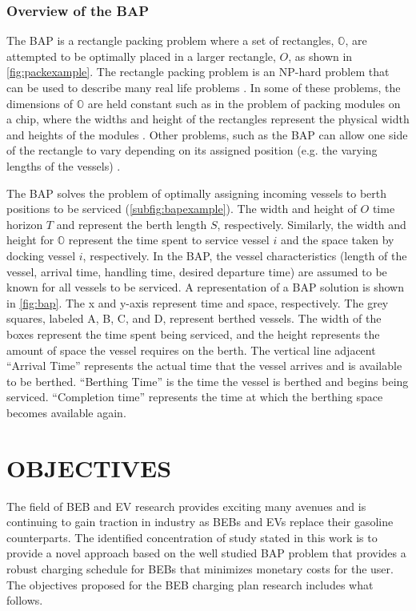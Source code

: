 \documentclass[ee,msthesis]{usuthesis}
\begin{document}
\subsection{Overview of the BAP}
\label{sec:overview-of-the-bap}
The BAP is a rectangle packing problem where a set of rectangles, \(\mathbb{O}\), are attempted to be optimally placed in
a larger rectangle, \(O\), as shown in \autoref{fig:packexample}. The rectangle packing problem is an NP-hard problem that
can be used to describe many real life problems \cite{bruin-2013-rectan-packin,murata-1995-rectan}. In some of these
problems, the dimensions of \(\mathbb{O}\) are held constant such as in the problem of packing modules on a chip, where
the widths and height of the rectangles represent the physical width and heights of the modules
\cite{murata-1995-rectan}. Other problems, such as the BAP can allow one side of the rectangle to vary depending on its
assigned position (e.g. the varying lengths of the vessels) \cite{buhrkal-2011-model-discr}.

The BAP solves the problem of optimally assigning incoming vessels to berth positions to be serviced
(\autoref{subfig:bapexample}). The width and height of \(O\) time horizon \(T\) and represent the berth length \(S\),
respectively. Similarly, the width and height for \(\mathbb{O}\) represent the time spent to service vessel \(i\) and the
space taken by docking vessel \(i\), respectively. In the BAP, the vessel characteristics (length of the vessel, arrival
time, handling time, desired departure time) are assumed to be known for all vessels to be serviced. A representation of
a BAP solution is shown in \autoref{fig:bap}. The x and y-axis represent time and space, respectively. The grey squares,
labeled A, B, C, and D, represent berthed vessels. The width of the boxes represent the time spent being serviced, and
the height represents the amount of space the vessel requires on the berth. The vertical line adjacent
 ``Arrival Time'' represents the actual
time that the vessel arrives and is available to be berthed. ``Berthing Time'' is the time the vessel is berthed and
begins being serviced. ``Completion time'' represents the time at which the berthing space becomes available again.
\chapter{OBJECTIVES}
\label{sec:objectives}
The field of BEB and EV research provides exciting many avenues and is continuing to gain traction in industry as BEBs
and EVs replace their gasoline counterparts. The identified concentration of study stated in this work is to provide a
novel approach based on the well studied BAP problem that provides a robust charging schedule for BEBs that minimizes
monetary costs for the user. The objectives proposed for the BEB charging plan research includes what follows.
\end{document}
